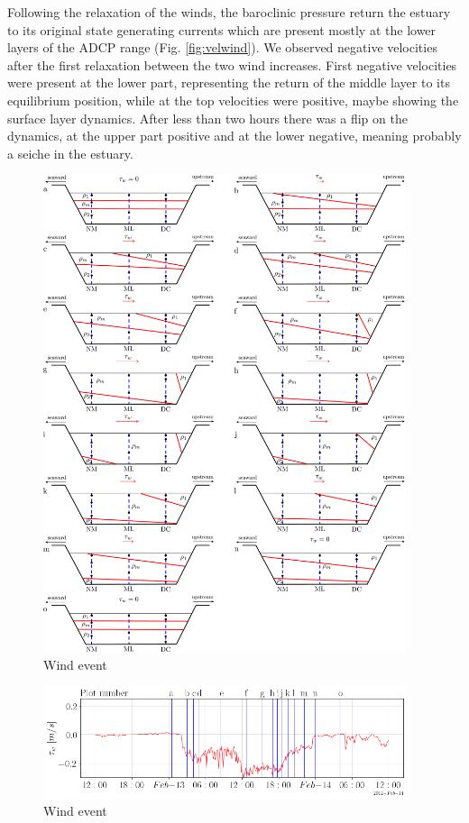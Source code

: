 \documentclass[tesis.tex]{subfiles}
\begin{document}
Following the relaxation of the winds, the baroclinic pressure return the estuary to its original state generating currents which are present mostly at the lower layers of the ADCP range (Fig. \ref{fig:velwind}). We observed negative velocities after the first relaxation between the two wind increases. First negative velocities were present at the lower part, representing the return of the middle layer to its equilibrium position, while at the top velocities were positive, maybe showing the surface layer dynamics. After less than two hours there was a flip on the dynamics, at the upper part positive and at the lower negative, meaning probably a seiche in the estuary.\\

\newpage
\begin{figure}[h!]
    \centering
    \includegraphics[width=0.95\textwidth]{Imagenes/wind_event.png}
    \caption{Wind event}
    \label{fig:wevent}
\end{figure}

\newpage
\begin{figure}[h!]
    \centering
    \includegraphics[width=0.95\textwidth]{Imagenes/wind_event2.png}
    \caption{Wind event}
    \label{fig:wevent2}
\end{figure}
\end{document}
